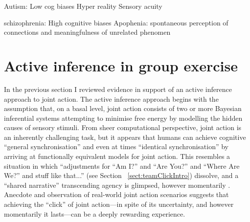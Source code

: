 \begin{CJK}{UTF8}{gbsn}
Autism:
Low cog biases
Hyper reality
Sensory acuity

schizophrenia:
High cognitive biases
Apophenia: spontaneous perception of connections and meaningfulness of unrelated phenomen







\section{Active inference in group exercise \label{sect:activeInfGE}}

In the previous section I reviewed evidence in support of an active inference approach to joint action.  The active inference approach begins with the assumption that, on a basal level, joint action consists of two or more Bayesian inferential systems attempting to minimise free energy by modelling the hidden causes of sensory stimuli.  From sheer computational perspective, joint action is an inherently challenging task, but it appears that humans can achieve cognitive ``general synchronisation'' and even at times ``identical synchronisation'' by arriving at functionally equivalent models for joint action.  This resembles a situation in which ``adjustments for ``Am I?'' and ``Are You?'' and ``Where Are We?'' and stuff like that...'' (see Section ~\ref{sect:teamClickIntro}) dissolve, and a ``shared narrative'' transcending agency is glimpsed, however momentarily \citep{Friston2015}.  Anecdote and observation of real-world joint action scenarios suggests that achieving the ``click'' of joint action---in spite of its uncertainty, and however momentarily it lasts---can be a deeply rewarding experience.


\end{CJK}
